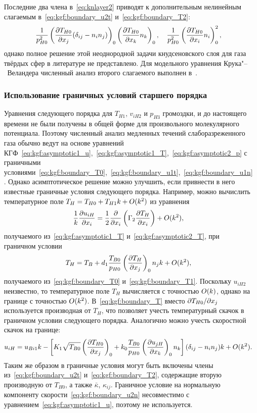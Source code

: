 Последние два члена в~\eqref{eq:knlayer2} приводят к дополнительным нелинейным слагаемым
в~\eqref{eq:kgf:boundary_u2t} и~\eqref{eq:kgf:boundary_T2}:
\begin{equation}\label{eq:boundary_nonlinear}
    \frac1{p_{H0}^2}\onwall{\pder[T_{H0}]{x_j}\deltann{i}{j}}\onwall{\pder[T_{H0}]{x_k}n_k}, \quad
    \frac1{p_{H0}^2}\onwall{\pder[T_{H0}]{x_i}n_i}^2,
\end{equation}
однако полное решение этой неоднородной задачи кнудсеновского слоя для газа твёрдых сфер в литературе не представлено.
Для модельного уравнения Крука"--~Веландера численный анализ второго слагаемого выполнен в~\cite{Sone1970}.

\subsubsection{Использование граничных условий старшего порядка}

Уравнения следующего порядка для \(T_{H1}\), \(v_{iH2}\) и \(p_{H3}\) громоздки,
и до настоящего времени не были получены в общей форме для произвольного молекулярного потенциала.
Поэтому численный анализ медленных течений слаборазреженного газа обычно ведут
на основе уравнений КГФ~\eqref{eq:kgf:asymptotic1_u},~\eqref{eq:kgf:asymptotic1_T},~\eqref{eq:kgf:asymptotic2_p}
с граничными условиями~\eqref{eq:kgf:boundary_T0},~\eqref{eq:kgf:boundary_u1t},~\eqref{eq:kgf:boundary_u1n}.
Однако асимптотическое решение можно улучшить,
если привнести в него известные граничные условия следующего порядка.
Например, можно вычислить температурное поле \(T_H = T_{H0} + T_{H1}k + \OO{k^2}\) из уравнения
\begin{equation}\label{eq:asymptotic_T}
    \frac1k\pder[u_{iH}]{x_i} = \frac12\pder{x_i}\left(\Gamma_2\pder[T_H]{x_i}\right) + \OO{k^2},
\end{equation}
получаемого из~\eqref{eq:kgf:asymptotic1_T} и~\eqref{eq:kgf:asymptotic2_T},
при граничном условии
\begin{equation}\label{eq:kgf:boundary_T}
    T_H = T_B + d_1\frac{T_{B0}}{p_{H0}}\onwall{\pder[T_H]{x_j}}n_j k + \OO{k^2},
\end{equation}
получаемого из~\eqref{eq:kgf:boundary_T0} и~\eqref{eq:kgf:boundary_T1}.
Поскольку \(u_{iH2}\) неизвестно, то температурное поле \(T_H\) вычисляется с точностью \(\OO{k}\),
однако на границе с точностью \(\OO{k^2}\).
В~\eqref{eq:kgf:boundary_T} вместо \(\Pder[T_{H0}]{x_j}\) используется производная от \(T_H\),
что позволяет учесть температурный скачок в граничном условии следующего порядка.
Аналогично можно учесть скоростной скачок на границе:
\begin{equation}\label{eq:boundary_u}
    u_{iH} = u_{Bi1}k - \left[ K_1\sqrt{T_{B0}}\onwall{\pder[T_{H0}]{x_j}}
        + k_0\frac{T_{B0}}{p_{H0}}\onwall{\pder[u_{jH}]{x_k}}n_k \right] \deltann{i}{j}k + \OO{k^2}.
\end{equation}
Таким же образом в граничные условия могут быть включены члены
из~\eqref{eq:kgf:boundary_u2t} и~\eqref{eq:kgf:boundary_T2},
содержащие вторую производную от \(T_{H0}\), а также \(\bar\kappa\), \(\kappa_{ij}\).
Граничное условие на нормальную компоненту скорости~\eqref{eq:kgf:boundary_u2n}
несовместимо с уравнением~\eqref{eq:kgf:asymptotic1_u}, поэтому не используется.

